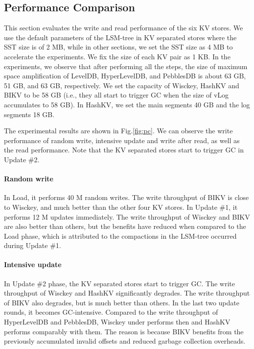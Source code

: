 \documentclass[sigconf]{acmart}
\begin{document}
\subsection{Performance Comparison}
This section evaluates the write and read performance of the six KV stores. We use the default parameters of the LSM-tree in KV separated stores where the SST size is of 2 MB, while in other sections, we set the SST size as 4 MB to accelerate the experiments. We fix the size of each KV pair as 1 KB. In the experiments, we observe that after performing all the steps, the size of maximum space amplification of LevelDB, HyperLevelDB, and PebblesDB is about 63 GB, 51 GB, and 63 GB, respectively.  We set the capacity of Wisckey, HashKV and BIKV to be 58 GB (i.e., they all start to trigger GC when the size of vLog accumulates to 58 GB). In HashKV, we set the main segments 40 GB and the log segments 18 GB. 

The experimental results are shown in Fig.\ref{fig:pc}. We can observe the write performance of random write, intensive update and write after read, as well as the read performance. Note that the KV separated stores start to trigger GC in Update \#2.

\paragraph*{Random write}
In Load, it performs 40 M random writes. The write throughput of BIKV is close to Wisckey, and much better than the other four KV stores. In Update \#1, it performs 12 M updates immediately. The write throughput of Wisckey and BIKV are also better than others, but the benefits have reduced when compared to the Load phase, which is attributed to the compactions in the LSM-tree occurred during Update \#1.

\paragraph*{Intensive update}
In Update \#2 phase, the KV separated stores start to trigger GC. The write throughput of Wisckey and HashKV significantly degrades. The write throughput of BIKV also degrades, but is much better than others. In the last two update rounds, it becomes GC-intensive. Compared to the write throughput of HyperLevelDB and PebblesDB, Wisckey under performs then and HashKV performs comparably with them. The reason is because BIKV benefits from the previously accumulated invalid offsets and reduced garbage collection overheads. 
\end{document}
